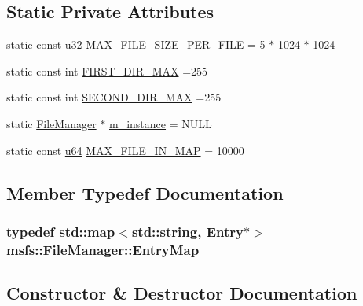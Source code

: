 \subsection*{Static Private Attributes}
\begin{DoxyCompactItemize}
\item 
static const \hyperlink{_portable_8h_a10e94b422ef0c20dcdec20d31a1f5049}{u32} \hyperlink{classmsfs_1_1_file_manager_a67c779dc06afccdc92bb3f5fbd52b540}{M\+A\+X\+\_\+\+F\+I\+L\+E\+\_\+\+S\+I\+Z\+E\+\_\+\+P\+E\+R\+\_\+\+F\+I\+L\+E} = 5 $\ast$ 1024 $\ast$ 1024
\item 
static const int \hyperlink{classmsfs_1_1_file_manager_a8d26710d14449def8ef3fbf2d9548b5f}{F\+I\+R\+S\+T\+\_\+\+D\+I\+R\+\_\+\+M\+A\+X} =255
\item 
static const int \hyperlink{classmsfs_1_1_file_manager_a8d45d9f54bb93a6f1f4520f05fb74086}{S\+E\+C\+O\+N\+D\+\_\+\+D\+I\+R\+\_\+\+M\+A\+X} =255
\item 
static \hyperlink{classmsfs_1_1_file_manager}{File\+Manager} $\ast$ \hyperlink{classmsfs_1_1_file_manager_a0db4b217b8aa4a66440fcc0484e7e1d9}{m\+\_\+instance} = N\+U\+L\+L
\item 
static const \hyperlink{_portable_8h_ad758b7a5c3f18ed79d2fcd23d9f16357}{u64} \hyperlink{classmsfs_1_1_file_manager_a8912c6b7358cf5aa91cd85ea70f1758e}{M\+A\+X\+\_\+\+F\+I\+L\+E\+\_\+\+I\+N\+\_\+\+M\+A\+P} = 10000
\end{DoxyCompactItemize}


\subsection{Member Typedef Documentation}
\hypertarget{classmsfs_1_1_file_manager_a645a98d3bf6d0dafa69369db633f7f7f}{}
\subsubsection[{Entry\+Map}]{\setlength{\rightskip}{0pt plus 5cm}typedef std\+::map$<$std\+::string, {\bf Entry}$\ast$$>$ {\bf msfs\+::\+File\+Manager\+::\+Entry\+Map}\hspace{0.3cm}{\ttfamily [protected]}}\label{classmsfs_1_1_file_manager_a645a98d3bf6d0dafa69369db633f7f7f}


\subsection{Constructor \& Destructor Documentation}
\hypertarget{classmsfs_1_1_file_manager_af71f3f5539a88cd85c44ecc477754bdf}{}
